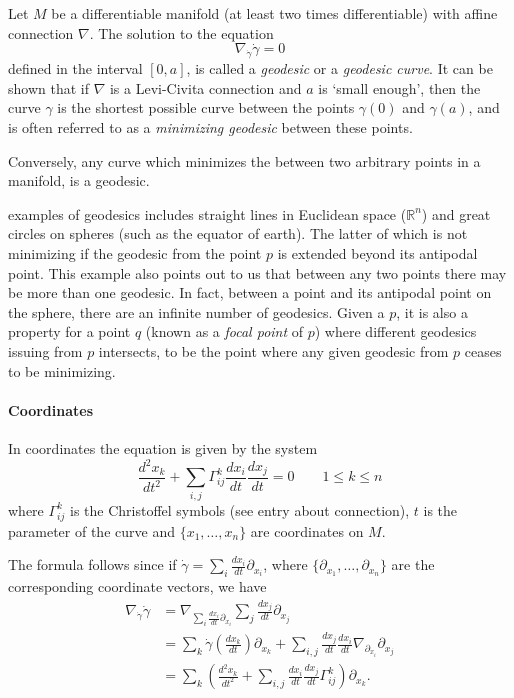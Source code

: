 \documentclass[12pt]{article}
\begin{document}

Let $M$ be a differentiable manifold (at least two times differentiable) with affine connection $\nabla$. The solution to the equation \[\nabla_{\dot\gamma}\dot{\gamma}=0\] defined in the interval $[0,a]$, is called a \emph{geodesic} or a \emph{geodesic curve}. 
It can be shown that if $\nabla$ is a Levi-Civita connection and $a$ is `small enough', then the curve $\gamma$ is the shortest possible curve between the points $\gamma(0)$ and $\gamma(a)$, and is often referred to as a \emph{minimizing geodesic} between these points.

Conversely, any curve which minimizes the  between two arbitrary points in a manifold, is a geodesic.

 examples of geodesics includes straight lines in Euclidean space ($\mathbb{R}^n$) and great circles on spheres (such as the equator of earth).  The latter of which is not minimizing if the geodesic from the point $p$ is extended beyond its antipodal point. This example also points out to us that between any two points there may be more than one geodesic. In fact, between a point and its antipodal point on the sphere, there are an infinite number of geodesics. Given a  $p$, it is also a property for a point $q$ (known as a \emph{focal point} of $p$) where different geodesics issuing from $p$ intersects, to be the point where any given geodesic from $p$ ceases to be minimizing. 

\paragraph{Coordinates}
In coordinates the equation is given by the system \[\frac{d^2x_k}{dt^2}+\sum_{i,j}\Gamma^k_{ij}\frac{dx_i}{dt}\frac{dx_j}{dt}=0 \qquad 1\leq k \leq n\]
where $\Gamma^k_{ij}$ is the Christoffel symbols (see entry about connection), $t$ is the parameter of the curve and $\{x_1, \ldots , x_n\}$ are coordinates on $M$.

The formula follows since if $\displaystyle {\dot{\gamma}}= \sum_i\frac{dx_i}{dt}\partial_{x_i}$, where  $\{\partial_{x_1}, \ldots , \partial_{x_n}\}$ are the corresponding coordinate vectors, we have 
\begin{align*}
\nabla_{\dot{\gamma}}{\dot{\gamma}}&= \nabla_{\sum_i\frac{dx_i}{dt}\partial_{x_i}}{\sum_j\frac{dx_j}{dt}\partial_{x_j}}\\
&=\sum_k\dot{\gamma}\left(\frac{dx_k}{dt}\right)\partial_{x_k}+ \sum_{i,j}\frac{dx_j}{dt}\frac{dx_i}{dt}\nabla_{\partial_{x_i}}\partial_{x_j} \\
&=\sum_k\left( \frac{d^2x_k}{dt^2}+\sum_{i,j} \frac{dx_i}{dt}\frac{dx_j}{dt}\Gamma^k_{ij}\right)\partial_{x_k}.
\end{align*}
\end{document}
